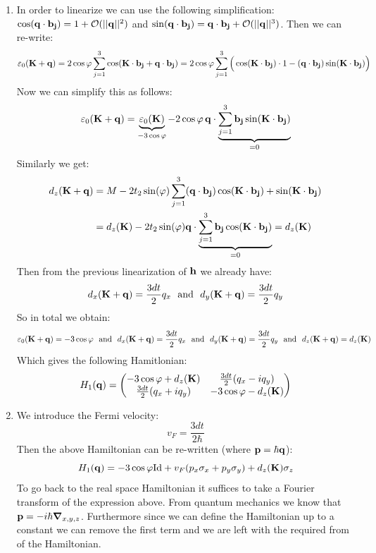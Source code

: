 \documentclass[10pt,a4paper]{article}
\begin{document}
\begin{enumerate}
\item In order to linearize we can use the following simplification: $\cos(\vb{q} \cdot \vb{b_j}) = 1 + \mathcal{O}(||\vb{q}||^2)$ and $\sin(\vb{q} \cdot \vb{b_j}) = \vb{q} \cdot \vb{b_j} + \mathcal{O}(||\vb{q}||^3)$. Then we can re-write:
\[
\varepsilon_0(\vb{K} + \vb{q}) = 2\cos\varphi \sum_{j = 1}^3 \cos(\vb{K} \cdot \vb{b_j} + \vb{q} \cdot \vb{b_j}) = 2 \cos\varphi \sum_{j = 1}^3 \Big( \cos(\vb{K} \cdot \vb{b_j}) \cdot 1 - (\vb{q} \cdot \vb{b_j}) \sin(\vb{K} \cdot \vb{b_j})  \Big)
\] 
Now we can simplify this as follows:
\[
\varepsilon_0(\vb{K} + \vb{q}) = \underbrace{\varepsilon_0(\vb{K})}_{-3 \cos \varphi} - 2 \cos \varphi \, \vb{q} \cdot \underbrace{\sum_{j = 1}^3 \vb{b_j} \sin(\vb{K} \cdot \vb{b_j})}_{= 0}
\]
Similarly we get:
\begin{align*}
d_z(\vb{K} + \vb{q}) &= M - 2 t_2 \sin(\varphi) \sum_{j = 1}^3 (\vb{q} \cdot \vb{b_j})\cos(\vb{K} \cdot \vb{b_j}) + \sin(\vb{K} \cdot \vb{b_j}) \\
&= d_z(\vb{K}) - 2 t_2 \sin(\varphi) \vb{q} \cdot \underbrace{\sum_{j = 1}^3 \vb{b_j} \cos(\vb{K} \cdot \vb{b_j})}_{= 0} = d_z(\vb{K})
\end{align*}
Then from the previous linearization of $\vb{h}$ we already have:
\[
d_x(\vb{K} + \vb{q}) = \frac{3 d t}{2} q_x \mbox{~~and~~} d_y(\vb{K} + \vb{q}) = \frac{3 d t}{2} q_y
\]
So in total we obtain:
\[
\varepsilon_0(\vb{K}+\vb{q}) = -3 \cos \varphi \mbox{~~and~~} d_x(\vb{K} + \vb{q}) = \frac{3 d t}{2} q_x \mbox{~~and~~} d_y(\vb{K} + \vb{q}) = \frac{3 d t}{2} q_y \mbox{~~and~~} d_z(\vb{K} + \vb{q}) = d_z(\vb{K})
\]
Which gives the following Hamitlonian:
\[
H_1(\vb{q}) = \begin{pmatrix}
- 3 \cos\varphi + d_z(\vb{K}) & \frac{3 dt}{2}(q_x - i q_y)\\
\frac{3 dt}{2}(q_x + i q_y)  & - 3 \cos \varphi - d_z(\vb{K})
\end{pmatrix}
\]
\item We introduce the Fermi velocity:
\[
v_F = \frac{3 d t}{2\hbar}
\]
Then the above Hamiltonian can be re-written (where $\vb{p} = \hbar \vb{q}$):
\[
H_1(\vb{q}) = -3 \cos\varphi \text{Id} + v_F(p_x \sigma_x + p_y \sigma_y) + d_z(\vb{K}) \sigma_z
\]
To go back to the real space Hamiltonian it suffices to take a Fourier transform of the expression above. From quantum mechanics we know that $\vb{p} = -i\hbar \grad_{x, y, z}$. Furthermore since we can define the Hamiltonian up to a constant we can remove the first term and we are left with the required from of the Hamiltonian. 


\end{enumerate}
\end{document}
